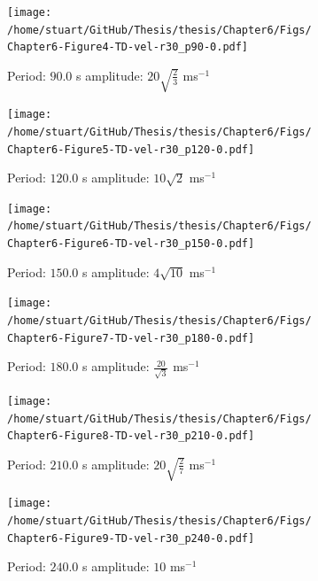 \documentclass[a4paper,12pt,fourier,authoryear,custommargin]{Classes/PhDThesisPSnPDF}
\begin{document}
\begin{figure}
    \centering
\ContinuedFloat


    \begin{subfigure}[b]{0.79\columnwidth}
        \texttt{[image: /home/stuart/GitHub/Thesis/thesis/Chapter6/Figs/Chapter6-Figure4-TD-vel-r30\_p90-0.pdf]}
        \caption{Period: $90.0$ s amplitude: $20\sqrt{\frac{2}{3}}$ ms$^{{-1}}$}
        \label{fig:TD-vel-r30-p90-0}
    \end{subfigure}

    \begin{subfigure}[b]{0.79\columnwidth}
        \texttt{[image: /home/stuart/GitHub/Thesis/thesis/Chapter6/Figs/Chapter6-Figure5-TD-vel-r30\_p120-0.pdf]}
        \caption{Period: $120.0$ s amplitude: $10\sqrt{2}$ ms$^{{-1}}$}
        \label{fig:TD-vel-r30-p120-0}
    \end{subfigure}
    \caption{}
    \label{fig:TD-vel-r30-c}
\end{figure}

\begin{figure}
    \centering
\ContinuedFloat


    \begin{subfigure}[b]{0.79\columnwidth}
        \texttt{[image: /home/stuart/GitHub/Thesis/thesis/Chapter6/Figs/Chapter6-Figure6-TD-vel-r30\_p150-0.pdf]}
        \caption{Period: $150.0$ s amplitude: $4\sqrt{10}$ ms$^{{-1}}$}
        \label{fig:TD-vel-r30-p150-0}
    \end{subfigure}

    \begin{subfigure}[b]{0.79\columnwidth}
        \texttt{[image: /home/stuart/GitHub/Thesis/thesis/Chapter6/Figs/Chapter6-Figure7-TD-vel-r30\_p180-0.pdf]}
        \caption{Period: $180.0$ s amplitude: $\frac{20}{\sqrt{3}}$ ms$^{{-1}}$}
        \label{fig:TD-vel-r30-p180-0}
    \end{subfigure}
    \caption{}
    \label{fig:TD-vel-r30-c}
\end{figure}

\begin{figure}
    \centering
\ContinuedFloat


    \begin{subfigure}[b]{0.79\columnwidth}
        \texttt{[image: /home/stuart/GitHub/Thesis/thesis/Chapter6/Figs/Chapter6-Figure8-TD-vel-r30\_p210-0.pdf]}
        \caption{Period: $210.0$ s amplitude: $20\sqrt{\frac{2}{7}}$ ms$^{{-1}}$}
        \label{fig:TD-vel-r30-p210-0}
    \end{subfigure}

    \begin{subfigure}[b]{0.79\columnwidth}
        \texttt{[image: /home/stuart/GitHub/Thesis/thesis/Chapter6/Figs/Chapter6-Figure9-TD-vel-r30\_p240-0.pdf]}
        \caption{Period: $240.0$ s amplitude: $10$ ms$^{{-1}}$}
        \label{fig:TD-vel-r30-p240-0}
    \end{subfigure}
    \caption{}
    \label{fig:TD-vel-r30-c}
\end{figure}
\end{document}
